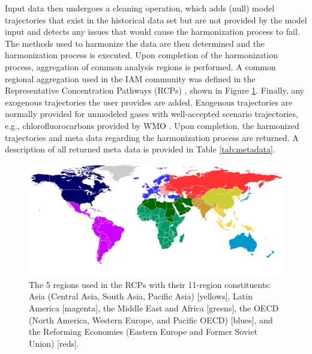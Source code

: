 \documentclass[review]{elsarticle}
\begin{document}
Input data then undergoes a cleaning operation, which adds (null) model
trajectories that exist in the historical data set but are not provided by the
model input and detects any issues that would cause the harmonization process to
fail. The methods used to harmonize the data are then determined and the
harmonization process is executed. Upon completion of the harmonization process,
aggregation of common analysis regions is performed. A common regional
aggregation used in the IAM community was defined in the Representative
Concentration Pathways (RCPs) \cite{vuuren_representative_2011}, shown in Figure
\ref{fig:regions}. Finally, any exogenous trajectories the user provides are
added. Exogenous trajectories are normally provided for unmodeled gases with
well-accepted scenario trajectories, e.g., chlorofluorocarbons provided by WMO
\cite{wmo2014}. Upon completion, the harmonized trajectories and meta data
regarding the harmonization process are returned. A description of all returned
meta data is provided in Table \ref{tab:metadata}.


\begin{figure}
  \begin{center}
    \includegraphics[width=\textwidth]{MESSAGE_11-5regions_map.pdf}
    \caption[]{
      \label{fig:regions}
      The 5 regions used in the RCPs with their 11-region constituents: Asia
      (Central Asia, South Asia, Pacific Asia) [yellows], Latin America
      [magenta], the Middle East and Africa [greens], the OECD (North America,
      Western Europe, and Pacific OECD) [blues], and the Reforming Economies
      (Eastern Europe and Former Soviet Union) [reds].  }
  \end{center}
\end{figure}
\end{document}
